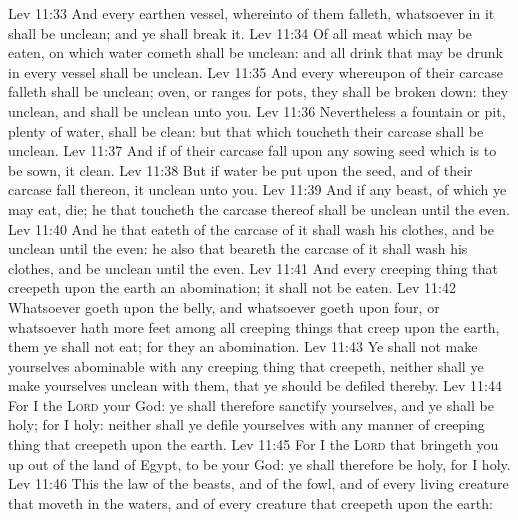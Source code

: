 \vs Lev 11:33 And every earthen vessel, whereinto  of them falleth, whatsoever  in it shall be unclean; and ye shall break it.
\vs Lev 11:34 Of all meat which may be eaten,  on which  water cometh shall be unclean: and all drink that may be drunk in every  vessel shall be unclean.
\vs Lev 11:35 And every  whereupon  of their carcase falleth shall be unclean;  oven, or ranges for pots, they shall be broken down:  they  unclean, and shall be unclean unto you.
\vs Lev 11:36 Nevertheless a fountain or pit,  plenty of water, shall be clean: but that which toucheth their carcase shall be unclean.
\vs Lev 11:37 And if  of their carcase fall upon any sowing seed which is to be sown, it  clean.
\vs Lev 11:38 But if  water be put upon the seed, and  of their carcase fall thereon, it  unclean unto you.
\vs Lev 11:39 And if any beast, of which ye may eat, die; he that toucheth the carcase thereof shall be unclean until the even.
\vs Lev 11:40 And he that eateth of the carcase of it shall wash his clothes, and be unclean until the even: he also that beareth the carcase of it shall wash his clothes, and be unclean until the even.
\vs Lev 11:41 And every creeping thing that creepeth upon the earth  an abomination; it shall not be eaten.
\vs Lev 11:42 Whatsoever goeth upon the belly, and whatsoever goeth upon  four, or whatsoever hath more feet among all creeping things that creep upon the earth, them ye shall not eat; for they  an abomination.
\vs Lev 11:43 Ye shall not make yourselves abominable with any creeping thing that creepeth, neither shall ye make yourselves unclean with them, that ye should be defiled thereby.
\vs Lev 11:44 For I  the \textsc{Lord} your God: ye shall therefore sanctify yourselves, and ye shall be holy; for I  holy: neither shall ye defile yourselves with any manner of creeping thing that creepeth upon the earth.
\vs Lev 11:45 For I  the \textsc{Lord} that bringeth you up out of the land of Egypt, to be your God: ye shall therefore be holy, for I  holy.
\vs Lev 11:46 This  the law of the beasts, and of the fowl, and of every living creature that moveth in the waters, and of every creature that creepeth upon the earth:
